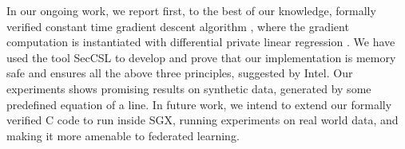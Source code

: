 \documentclass[sigplan,screen]{acmart}
\begin{document}
 In our ongoing work, we report first, to the best of our knowledge, formally verified 
 constant time 
 gradient descent algorithm \cite{abadi2016deep}, where the gradient computation is 
 instantiated with differential private linear regression \cite{alabi2020differentially}.
 We have used the tool SecCSL \cite{10.1007/978-3-030-25543-5_13} 
 to develop and prove that our implementation is memory safe and 
 ensures all the above three principles, suggested by Intel. Our experiments 
 shows promising results  on synthetic data, generated by some predefined equation of a line. 
 In future work, we intend to extend our formally verified C code to run 
 inside SGX, running experiments on real world data, and making it 
 more amenable to federated learning. 
 



\begin{comment}

\section{Background}
\subsection{Information Flow Security (Secure C)}


\subsection{Machine Learning}

\subsection{Trusted Execution Environment}

\subsection{Differential Privacy}


\section{Problem Formulation}
 There are n clients that don't want to share their data with 
 a server and therefore the server sends the model parameter to 

\end{comment}
 
 
\end{document}

